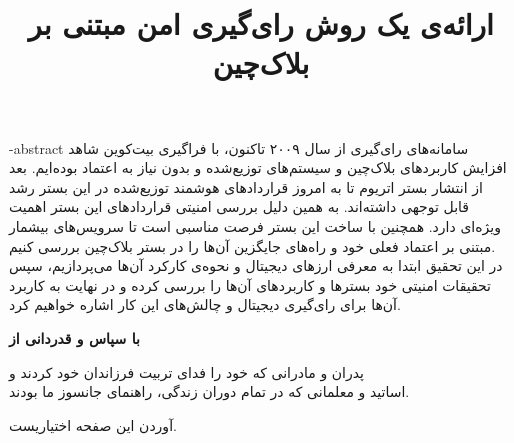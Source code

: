 \documentclass[oneside,openany,msc]{SBU-Thesis}
\begin{document}
	\title{ارائه‌ی یک روش رای‌گیری امن مبتنی بر بلاک‌چین}
	
	\subject{مهندسی کامپیوتر}
	
	
	
	
	


	
	
	
	\fa-abstract{	
		سامانه‌های رای‌گیری 
		از سال ۲۰۰۹ تاکنون، با فراگیری بیت‌‌کوین شاهد افزایش ‌کاربرد‌های بلاک‌چین و سیستم‌های توزیع‌شده و بدون نیاز به اعتماد بوده‌ایم. بعد از انتشار بستر اتریوم تا به امروز قرار‌داد‌های هوشمند توزیع‌شده در این بستر رشد قابل توجهی داشته‌اند. به همین دلیل بررسی امنیتی قرار‌داد‌های این بستر اهمیت ویژه‌ای دارد. همچنین با ساخت این بستر فرصت مناسبی است تا سرویس‌های بیشمار مبتنی بر اعتماد فعلی خود و راه‌های جایگزین آن‌ها را در بستر بلاک‌چین بررسی کنیم.
		\\
		در این تحقیق ابتدا به معرفی ارز‌های دیجیتال و نحوه‌ی کارکرد آن‌ها می‌پردازیم، سپس تحقیقات امنیتی خود بسترها و کاربرد‌های آن‌ها را بررسی کرده و در نهایت به کاربرد آن‌ها برای رای‌گیری دیجیتال و چالش‌های این کار اشاره خواهیم کرد. 
	}
	
\firstPage %
\davaranPage %

{
	\newpage
	\thispagestyle{plain}
	\noindent
	\large{\textbf{با سپاس و قدردانی از}}
	
	\noindent
	پدران و مادرانی که خود را فدای تربیت فرزاندان خود کردند و\\
	اساتید و معلمانی که در تمام دوران زندگی، راهنمای جانسوز ما بودند.
	
	
	\vspace{14cm}	
	آوردن این صفحه اختیاریست.
	
	\pagebreak
}
\end{document}
